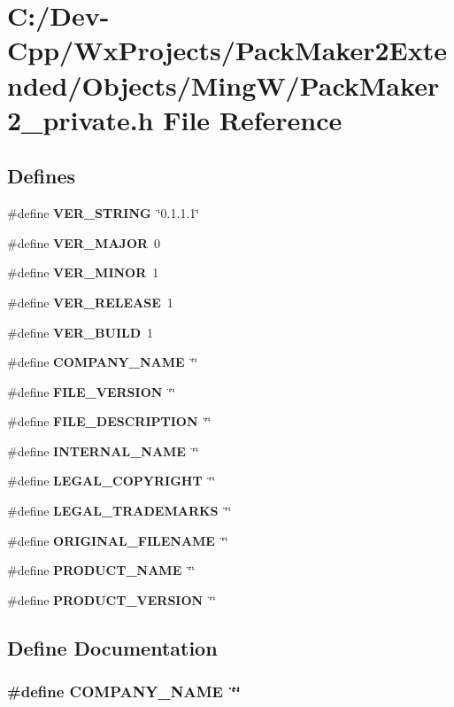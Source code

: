 \section{C:/Dev-Cpp/Wx\-Projects/Pack\-Maker2Extended/Objects/Ming\-W/Pack\-Maker2\_\-private.h File Reference}
\label{_pack_maker2__private_8h}
\subsection*{Defines}
\begin{CompactItemize}
\item 
\#define {\bf VER\_\-STRING}~\char`\"{}0.1.1.1\char`\"{}
\item 
\#define {\bf VER\_\-MAJOR}~0
\item 
\#define {\bf VER\_\-MINOR}~1
\item 
\#define {\bf VER\_\-RELEASE}~1
\item 
\#define {\bf VER\_\-BUILD}~1
\item 
\#define {\bf COMPANY\_\-NAME}~\char`\"{}\char`\"{}
\item 
\#define {\bf FILE\_\-VERSION}~\char`\"{}\char`\"{}
\item 
\#define {\bf FILE\_\-DESCRIPTION}~\char`\"{}\char`\"{}
\item 
\#define {\bf INTERNAL\_\-NAME}~\char`\"{}\char`\"{}
\item 
\#define {\bf LEGAL\_\-COPYRIGHT}~\char`\"{}\char`\"{}
\item 
\#define {\bf LEGAL\_\-TRADEMARKS}~\char`\"{}\char`\"{}
\item 
\#define {\bf ORIGINAL\_\-FILENAME}~\char`\"{}\char`\"{}
\item 
\#define {\bf PRODUCT\_\-NAME}~\char`\"{}\char`\"{}
\item 
\#define {\bf PRODUCT\_\-VERSION}~\char`\"{}\char`\"{}
\end{CompactItemize}


\subsection{Define Documentation}
\subsubsection{\setlength{\rightskip}{0pt plus 5cm}\#define COMPANY\_\-NAME~\char`\"{}\char`\"{}}\label{_pack_maker2__private_8h_9c76a8ad5fd75187ad154a79d392dfc2}




